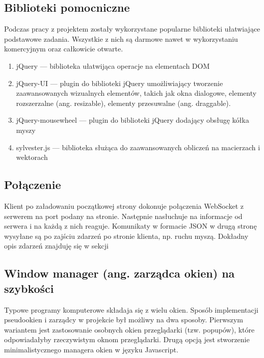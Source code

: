 \subsection{Biblioteki pomocniczne}
Podczas pracy z projektem zostały wykorzystane popularne biblioteki ułatwiające podstawowe zadania. Wszystkie z nich są darmowe nawet w wykorzystaniu komercyjnym oraz całkowicie otwarte.
\begin{enumerate}
  \item jQuery --- biblioteka ułatwijąca operacje na elementach DOM
  \item jQuery-UI --- plugin do biblioteki jQuery umożliwiający tworzenie zaawansowanych wizualnych elementów, takich jak okna dialogowe, elementy rozszerzalne (ang. resizable), elementy przesuwalne (ang. draggable).
  \item jQuery-mousewheel --- plugin do biblioteki jQuery dodający obsługę kółka myszy
  \item sylvester.js --- biblioteka służąca do zaawansowanych obliczeń na macierzach i wektorach
\end{enumerate}


\subsection{Połączenie}
Klient po załadowaniu początkowej strony dokonuje połączenia WebSocket z serwerem na port podany na stronie. Następnie nasłuchuje na informacje od serwera i na każdą z nich reaguje. Komunikaty w formacie JSON w drugą stronę wysyłane są po zajściu zdarzeń po stronie klienta, np. ruchu myszą. Dokładny opis zdarzeń znajduję się w sekcji %

\subsection{Window manager (ang. zarządca okien) na szybkości}
Typowe programy komputerowe składaja się z wielu okien. Sposób implementacji pseudookien i zarządcy w projekcie był możliwy na dwa sposoby.
Pierwszym wariantem jest zastosowanie osobnych okien przeglądarki (tzw. popupów), które odpowiadałyby rzeczywistym oknom przeglądarki.
Drugą opcją jest stworzenie minimalistycznego managera okien w języku Javascript.

